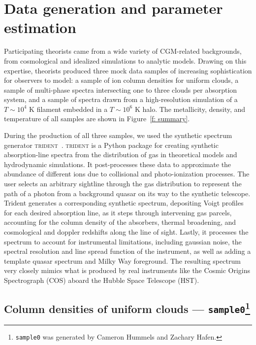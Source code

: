 \documentclass[fleqn,usenatbib]{mnras}
\begin{document}
\section{Data generation and parameter estimation}
\label{s: data generation}

Participating theorists came from a wide variety of CGM-related backgrounds, from cosmological and idealized simulations to analytic models.
Drawing on this expertise, theorists produced three mock data samples of increasing sophistication for observers to model:
a sample of ion column densities for uniform clouds,
a sample of multi-phase spectra intersecting one to three clouds per absorption system,
and a sample of spectra drawn from a high-resolution simulation of a $T \sim 10^4$ K filament embedded in a $T \sim 10^6$ K halo.
The metallicity, density, and temperature of all samples are shown in Figure~\ref{f: summary}.

During the production of all three samples, we used the synthetic spectrum generator \textsc{trident}~\citep{hummels2017Trident}.  \textsc{trident} is a Python package for creating synthetic absorption-line spectra from the distribution of gas in theoretical models and hydrodynamic simulations. It post-processes these data to approximate the abundance of different ions due to collisional and photo-ionization processes.  The user selects an arbitrary sightline through the gas distribution to represent the path of a photon from a background quasar on its way to the synthetic telescope.  Trident generates a corresponding synthetic spectrum, depositing Voigt profiles for each desired absorption line, as it steps through intervening gas parcels, accounting for the column density of the absorbers, thermal broadening, and cosmological and doppler redshifts along the line of sight.  Lastly, it processes the  spectrum to account for instrumental limitations, including gaussian noise, the spectral resolution and line spread function of the instrument, as well as adding a template quasar spectrum and Milky Way foreground.  The resulting spectrum very closely mimics what is produced by real instruments like the Cosmic Origins Spectrograph (COS) aboard the Hubble Space Telescope (HST).

\subsection[Column densities of uniform clouds --- \texttt{sample0}]{Column densities of uniform clouds --- \texttt{sample0}\footnote{
\texttt{sample0} was generated by Cameron Hummels and Zachary Hafen.}}
\label{s: data generation -- sample0}
\end{document}
